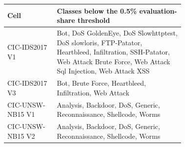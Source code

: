 \begin{tabular}{@{}lp{0.72\linewidth}@{}}
\toprule
Cell & Classes below the 0.5\% evaluation-share threshold \\
\midrule
CIC-IDS2017 V1 & Bot, DoS GoldenEye, DoS Slowhttptest, DoS slowloris, FTP-Patator, Heartbleed, Infiltration, SSH-Patator, Web Attack Brute Force, Web Attack Sql Injection, Web Attack XSS \\
CIC-IDS2017 V3 & Bot, Brute Force, Heartbleed, Infiltration, Web Attack \\
CIC-UNSW-NB15 V1 & Analysis, Backdoor, DoS, Generic, Reconnaissance, Shellcode, Worms \\
CIC-UNSW-NB15 V2 & Analysis, Backdoor, DoS, Generic, Reconnaissance, Shellcode, Worms \\
\bottomrule
\end{tabular}